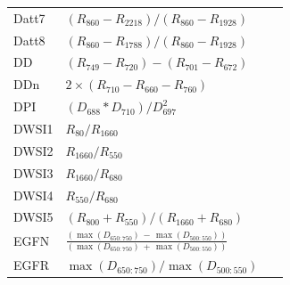 \documentclass[remotesensing,article,accept,moreauthors,pdftex]{Definitions/mdpi}
\begin{document}
\begin{paracol}{2}
\begin{specialtable}[H]
{\begin{tabular}{lll}
		Datt7           & $(R_{860} - R_{2218})/(R_{860} - R_{1928})$                                                          &~\cite{datt1999a}              \\
		Datt8           & $(R_{860} - R_{1788})/(R_{860} - R_{1928})$                                                          &~\cite{datt1999a}              \\
		DD              & $(R_{749}-R_{720})-(R_{701}-R_{672})$                                                                &~\cite{maire2004}              \\
		DDn             & $2\times (R_{710}-R_{660}-R_{760})$                                                                  &~\cite{lemaire2008}            \\
		DPI             & $(D_{688}*D_{710})/D_{697}^2$                                                                        &~\cite{zarco-tejada2003}      \\
		DWSI1           & $R_{80}/R_{1660}$                                                                                    &~\cite{apan2004}               \\
		DWSI2           & $R_{1660}/R_{550}$                                                                                   &~\cite{apan2004}               \\
		DWSI3           & $R_{1660}/R_{680}$                                                                                   &~\cite{apan2004}               \\
		DWSI4           & $R_{550}/R_{680}$                                                                                    &~\cite{apan2004}               \\
		DWSI5           & $(R_{800} + R_{550})/(R_{1660} + R_{680})$                                                           &~\cite{apan2004}               \\
		EGFN            & $\frac{(\max(D_{650:750})\,-\,\max(D_{500:550}))}{(\max(D_{650:750})\,+\,\max(D_{500:550}))}$                &~\cite{penuelas1994}           \\
		EGFR            & $\max(D_{650:750})/\max(D_{500:550})$                                                                &~\cite{penuelas1994}           \\

\end{tabular}}
\end{specialtable}
\end{paracol}
\end{document}
